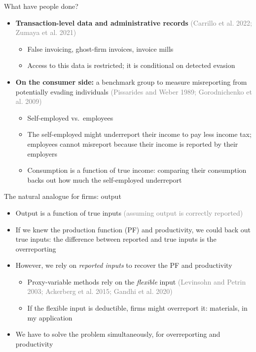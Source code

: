 \documentclass[
  ignorenonframetext,
  aspectratio=169,
]{beamer}
\providecommand{\tightlist}{%
  \setlength{\itemsep}{0pt}\setlength{\parskip}{0pt}}
\newcommand{\sm}[1]{\textcolor{gray}{\footnotesize #1}} %
\begin{document}
\begin{frame}{What have people done?}
\protect{}\label{what-have-people-done}
\begin{itemize}
\tightlist
\item
  \textbf{Transaction-level data and administrative records}
  \sm{(Carrillo et al. 2022; Zumaya et al. 2021)}

  \begin{itemize}
  \tightlist
  \item
    False invoicing, ghost-firm invoices, invoice mills
  \item
    Access to this data is restricted; it is conditional on detected
    evasion
  \end{itemize}
\item
  \textbf{On the consumer side:} a benchmark group to measure
  misreporting from potentially evading individuals \sm{(Pissarides and
  Weber 1989; Gorodnichenko et al. 2009)}

  \begin{itemize}
  \tightlist
  \item
    Self-employed vs.~employees
  \item
    The self-employed might underreport their income to pay less income
    tax; employees cannot misreport because their income is reported by
    their employers
  \item
    Consumption is a function of true income: comparing their
    consumption backs out how much the self-employed underreport
  \end{itemize}
\end{itemize}
\end{frame}

\begin{frame}{The natural analogue for firms: output}
\protect{}\label{the-natural-analogue-for-firms-output}
\begin{itemize}
\tightlist
\item
  Output is a function of true inputs \sm{(assuming output is correctly
  reported)}
\item
  If we knew the production function (PF) and productivity, we could
  back out true inputs: the difference between reported and true inputs
  is the overreporting
\item
  However, we rely on \emph{reported inputs} to recover the PF and
  productivity

  \begin{itemize}
  \tightlist
  \item
    Proxy-variable methods rely on the \emph{flexible} input
    \sm{(Levinsohn and Petrin 2003; Ackerberg et al. 2015; Gandhi et al.
    2020)}
  \item
    If the flexible input is deductible, firms might overreport it:
    materials, in my application
  \end{itemize}
\item
  We have to solve the problem simultaneously, for overreporting and
  productivity
\end{itemize}
\end{frame}
\end{document}

